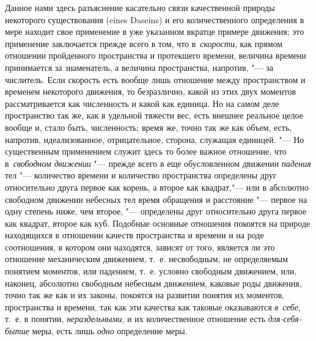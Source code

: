 Данное нами здесь разъяснение касательно связи качественной природы некоторого
существования (eines Daseins) и его количественного определения в мере находит
свое применение в уже указанном вкратце примере движения; это применение
заключается прежде всего в том, что в~{\em скорости}, как прямом отношении
пройденного пространства и протекшего времени, величина времени принимается за
знаменатель, а величина пространства, напротив, "--- за числитель. Если
скорость есть вообще лишь отношение между пространством и временем некоторого
движения, то безразлично, какой из этих двух моментов рассматривается как
численность и какой как единица. Но на самом деле пространство так же, как в
удельной тяжести вес, есть внешнее реальное целое вообще и, стало быть,
численность; время же, точно так же как объем, есть, напротив, идеализованное,
отрицательное, сторона, служащая единицей. "--- Но существенным применением
служит здесь то более важное отношение, что в~{\em свободном движении} "---
прежде всего в еще обусловленном движении {\em падения} тел "--- количество
времени и количество пространства определены друг относительно друга первое как
корень, а второе как квадрат,"--- или в абсолютно свободном движении небесных
тел время обращения и расстояние "--- первое на одну степень ниже, чем второе,
"--- определены друг относительно друга первое как квадрат, второе как куб.
Подобные основные отношения покоятся на природе находящихся в отношении качеств
пространства и времени и на роде соотношения, в котором они находятся, зависят
от того, является ли это отношение механическим движением, т.~е. несвободным,
не определяемым понятием моментов, или падением, т.~е. условно свободным
движением, или, наконец, абсолютно свободным небесным движением, каковые роды
движения, точно так же как и их законы, покоятся на развитии понятия их
моментов, пространства и времени, так как эти качества как таковые оказываются
{\em в~себе}, т.~е. в понятии, {\em нераздельными}, и их количественное
отношение есть {\em для-себя-бытие} меры, есть лишь {\em одно} определение
меры.

